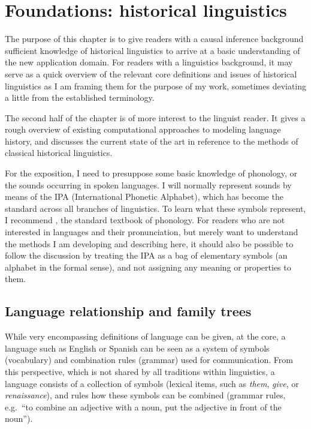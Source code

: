 \chapter{Foundations: historical linguistics}\label{sec:2}
The purpose of this chapter is to give readers with a causal inference background sufficient knowledge of historical linguistics to arrive at a basic understanding of the new application domain. For readers with a linguistics background, it may serve as a quick overview of the relevant core definitions and issues of historical linguistics as I am framing them for the purpose of my work, sometimes deviating a little from the established terminology.

The second half of the chapter is of more interest to the linguist reader. It gives a rough overview of existing computational approaches to modeling language history, and discusses the current state of the art in reference to the methods of classical historical linguistics.

For the exposition, I need to presuppose some basic knowledge of phonology, or the sounds occurring in spoken languages. I will normally represent sounds by means of the IPA (International Phonetic Alphabet), which has become the standard across all branches of linguistics. To learn what these symbols represent, I recommend \citet{ladefoged_maddieson_1996}, the standard textbook of phonology. For readers who are not interested in languages and their pronunciation, but merely want to understand the methods I am developing and describing here, it should also be possible to follow the discussion by treating the IPA as a bag of elementary symbols (an alphabet in the formal sense), and not assigning any meaning or properties to them.

\section{Language relationship and family trees}\label{sec:2:1}
While very encompassing definitions of language can be given, at the core, a language such as English or Spanish can be seen as a system of symbols (vocabulary) and combination rules (grammar) used for communication. From this perspective, which is not shared by all traditions within linguistics, a language consists of a collection of symbols (lexical items, such as \textit{them}, \textit{give}, or \textit{renaissance}), and rules how these symbols can be combined (grammar rules, e.g.\ ``to combine an adjective with a noun, put the adjective in front of the noun'').

